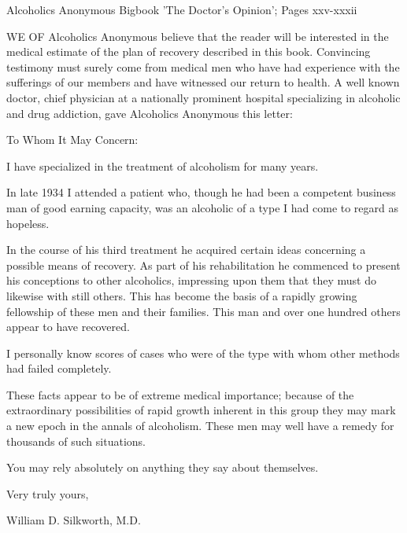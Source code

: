 
Alcoholics Anonymous Bigbook 'The Doctor's Opinion'; Pages xxv-xxxii

\begin{biblechapter}
    WE OF Alcoholics Anonymous believe that the reader will be interested in the medical estimate 
        of the plan of recovery described in this book. 
\verse Convincing testimony must surely come from medical men who have had experience with the sufferings of our members and have witnessed our return to health. 
\verse A well known doctor, chief physician at a nationally prominent hospital specializing in alcoholic and drug addiction, gave Alcoholics Anonymous this letter:
\end{biblechapter}


\begin{biblechapter}
    To Whom It May Concern:

\verse I have specialized in the treatment of alcoholism for many years.

\verse In late 1934 I attended a patient who, 
    though he had been a competent business man of good earning capacity, 
    was an alcoholic of a type I had come to regard as hopeless.

\verse In the course of his third treatment he acquired certain ideas concerning a possible means of recovery. 
\verse As part of his rehabilitation he commenced to present his conceptions to other alcoholics, 
    impressing upon them that they must do likewise with still others. 
\verse This has become the basis of a rapidly growing fellowship of these men and their families. 
\verse This man and over one hundred others appear to have recovered.

\verse I personally know scores of cases who were of the type with whom other methods had failed completely.

\verse These facts appear to be of extreme medical importance; 
    because of the extraordinary possibilities of rapid growth inherent in this group 
    they may mark a new epoch in the annals of alcoholism. 
\verse These men may well have a remedy for thousands of such situations.

\verse You may rely absolutely on anything they say about themselves.

\verse Very truly yours, 

William D. Silkworth, M.D.
\end{biblechapter}


